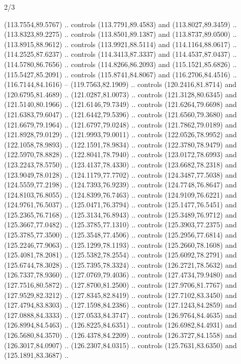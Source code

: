 \begin{flagdescription}{2/3}
\begin{scope}[shift={(0.5\flaglength,0.5)},scale=\flagwidth/320]
\begin{scope}[y=0.8pt, x=0.8pt, yscale=-1,shift={(-118.3,-146)}]
\path[fill=gold,line width=0.253\lw] %
  (113.7554,89.5767) .. controls
  (113.7791,89.4583) and (113.8027,89.3459) .. (113.8323,89.2275) .. controls
  (113.8501,89.1387) and (113.8737,89.0500) .. (113.8915,88.9612) .. controls
  (113.9921,88.5114) and (114.1164,88.0617) .. (114.2525,87.6237) .. controls
  (114.3413,87.3337) and (114.4537,87.0437) .. (114.5780,86.7656) .. controls
  (114.8266,86.2093) and (115.1521,85.6826) .. (115.5427,85.2091) .. controls
  (115.8741,84.8067) and (116.2706,84.4516) .. (116.7144,84.1616) --
  (119.7563,82.1909) .. controls (120.2416,81.8714) and (120.6795,81.4689) ..
  (121.0287,81.0073) .. controls (121.3128,80.6345) and (121.5140,80.1966) ..
  (121.6146,79.7349) .. controls (121.6264,79.6698) and (121.6383,79.6047) ..
  (121.6442,79.5396) .. controls (121.6560,79.3680) and (121.6679,79.1964) ..
  (121.6797,79.0248) .. controls (121.7862,79.0189) and (121.8928,79.0129) ..
  (121.9993,79.0011) .. controls (122.0526,78.9952) and (122.1058,78.9893) ..
  (122.1591,78.9834) .. controls (122.3780,78.9479) and (122.5970,78.8828) ..
  (122.8041,78.7940) .. controls (123.0172,78.6993) and (123.2243,78.5750) ..
  (123.4137,78.4330) .. controls (123.6682,78.2318) and (123.9049,78.0128) ..
  (124.1179,77.7702) .. controls (124.3487,77.5038) and (124.5559,77.2198) ..
  (124.7393,76.9239) .. controls (124.7748,76.8647) and (124.8103,76.8055) ..
  (124.8399,76.7463) .. controls (124.9109,76.6221) and (124.9761,76.5037) ..
  (125.0471,76.3794) .. controls (125.1477,76.5451) and (125.2365,76.7168) ..
  (125.3134,76.8943) .. controls (125.3489,76.9712) and (125.3667,77.0482) ..
  (125.3785,77.1310) .. controls (125.3903,77.2375) and (125.3785,77.3500) ..
  (125.3548,77.4506) .. controls (125.2956,77.6814) and (125.2246,77.9063) ..
  (125.1299,78.1193) .. controls (125.2660,78.1608) and (125.4081,78.2081) ..
  (125.5382,78.2554) .. controls (125.6092,78.2791) and (125.6744,78.3028) ..
  (125.7395,78.3324) .. controls (126.2721,78.5632) and (126.7337,78.9360) ..
  (127.0769,79.4036) .. controls (127.4734,79.9480) and (127.7516,80.5872) ..
  (127.8700,81.2500) .. controls (127.9706,81.7767) and (127.9529,82.3212) ..
  (127.8345,82.8419) .. controls (127.7102,83.3450) and (127.4794,83.8303) ..
  (127.1598,84.2386) .. controls (127.1243,84.2859) and (127.0888,84.3333) ..
  (127.0533,84.3747) .. controls (126.9764,84.4635) and (126.8994,84.5463) ..
  (126.8225,84.6351) .. controls (126.6982,84.4931) and (126.5680,84.3570) ..
  (126.4378,84.2209) .. controls (126.3727,84.1558) and (126.3017,84.0907) ..
  (126.2307,84.0315) .. controls (125.7631,83.6350) and (125.1891,83.3687) ..

\end{scope}
\end{scope}
\end{flagdescription}
